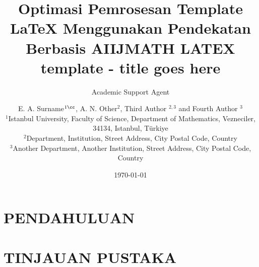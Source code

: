 \documentclass{ijmathtex}
\title{Optimasi Pemrosesan Template LaTeX Menggunakan Pendekatan Berbasis AI}
\author{Academic Support Agent}
\date{\today}
\begin{document}
\maketitle

\begin{abstract}

\end{abstract}

\chapter{PENDAHULUAN}


\chapter{TINJAUAN PUSTAKA}


\usepackage{newtxtext,newtxmath}
\usepackage[T1]{fontenc}
\usepackage{ae,aecompl}

\usepackage{multicol}   %
\usepackage{bm}		    %
\usepackage{pdflscape}	%

\newcommand{\textbit}[1]{\textbf{\textit{#1}}}
\newcommand{\inspace}[1]{\vspace*{#1}\noindent}

\title[IJMATH Latex template]{IJMATH LATEX template - title goes here}

\author[Surname et. al]{%
E. A. Surname$^{1\cc}$,
A. N. Other$^{2}$,
Third Author $^{2,3}$
and
Fourth Author $^{3}$
\affsep \\
$^1$Istanbul University, Faculty of Science, Department of Mathematics, Vezneciler, 34134, Istanbul, T\"{u}rkiye\\
$^2$Department, Institution, Street Address, City Postal Code, Country\\
$^3$Another Department, Another Institution, Street Address, City Postal Code, Country
}
\end{document}
